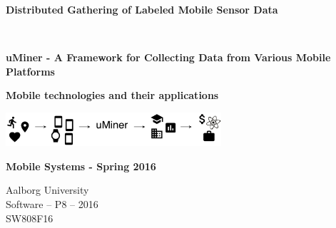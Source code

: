 
\begin{center}
	
	\vspace{8cm}

	\begin{spacing}{2.1}
		\begin{Huge}
			\textbf{Distributed Gathering of Labeled Mobile Sensor Data}
		\end{Huge}
		\\
		\vspace{0.6cm}
		\begin{huge}
			\textbf{uMiner - A Framework for Collecting Data from Various Mobile Platforms}
		\end{huge}
	\end{spacing}

	\vspace{0.6cm}

	\begin{Large}
		\textbf{Mobile technologies and their applications}
	\end{Large}

	\includegraphics[width=0.6\textwidth]{graphic/miscellaneous/front_page}

	\begin{large} 
		\textbf{Mobile Systems - Spring 2016}
	\end{large}

	\vspace*{\fill}

	Aalborg University		\\
	Software -- P8 -- 2016	\\
	SW808F16				\\

\end{center}



\thispagestyle{empty}